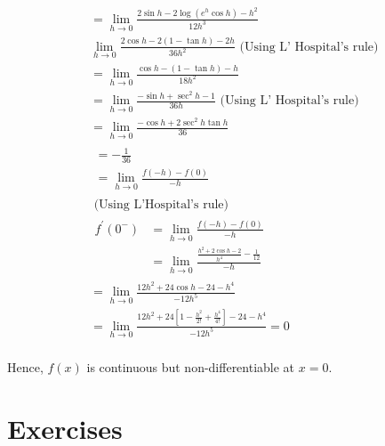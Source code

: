 \begin{enumerate}
\begin{outline}
$$
\begin{aligned}
& =\lim _{h \rightarrow 0} \frac{2 \sin h-2 \log \left(e^h \cos h\right)-h^2}{12 h^3} \\
& \lim _{h \rightarrow 0} \frac{2 \cos h-2(1-\tan h)-2 h}{36 h^2} \text { (Using L' Hospital's rule) } \\
& =\lim _{h \rightarrow 0} \frac{\cos h-(1-\tan h)-h}{18 h^2} \\
& =\lim _{h \rightarrow 0} \frac{-\sin h+\sec ^2 h-1}{36 h} \text { (Using L' Hospital's rule) } \\
& =\lim _{h \rightarrow 0} \frac{-\cos h+2 \sec ^2 h \tan h}{36} \\
& \begin{array}{l}
=-\frac{1}{36} \\
=\lim _{h \rightarrow 0} \frac{f(-h)-f(0)}{-h}
\end{array} \\
& \text { (Using L'Hospital's rule) } \\
& \begin{aligned}
f^{\prime}\left(0^{-}\right) & =\lim _{h \rightarrow 0} \frac{f(-h)-f(0)}{-h} \\
& =\lim _{h \rightarrow 0} \frac{\frac{h^2+2 \cos h-2}{h^4}-\frac{1}{12}}{-h}
\end{aligned} \\
& =\lim _{h \rightarrow 0} \frac{12 h^2+24 \cos h-24-h^4}{-12 h^5} \\
& =\lim _{h \rightarrow 0} \frac{12 h^2+24\left[1-\frac{h^2}{2 !}+\frac{h^4}{4 !}\right]-24-h^4}{-12 h^5}=0 \\
&
\end{aligned}
$$

Hence, $f(x)$ is continuous but non-differentiable at $x=0$.
\end{outline}

\end{enumerate}


\section{Exercises}

